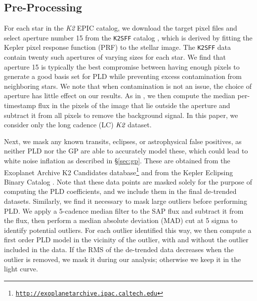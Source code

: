 \documentclass[]{emulateapj}
\begin{document}
\subsection{Pre-Processing}
\label{sec:pre}
For each star in the \emph{K2} EPIC catalog, we download the target pixel files and
select aperture number 15 from the \texttt{K2SFF} catalog \citep{VJ14, VAN14}, which is derived
by fitting the Kepler pixel response function (PRF) to the stellar image. The \texttt{K2SFF}
data contain twenty such apertures of varying sizes for each star. We find that aperture 15
is typically the best compromise between having enough pixels to generate a good basis
set for PLD while preventing excess contamination from neighboring stars. We note that
when contamination is not an issue, the choice of aperture has little effect on our results.
As in \cite{VJ14}, we then compute the median per-timestamp flux in the pixels of the image 
that lie outside the aperture and subtract it from all pixels
to remove the background signal. In this paper, we consider only the long cadence (LC)
$\emph{K2}$ dataset.

Next, we mask any known transits, eclipses, or astrophysical false positives, as neither
PLD nor the GP are able to accurately model these, which could lead to white noise
inflation as described in \S\ref{sec:gp}. These are obtained from the Exoplanet Archive
K2 Candidates database\footnote{\texttt{\url{http://exoplanetarchive.ipac.caltech.edu}}} and from
the Kepler Eclipsing Binary Catalog \citep{LAC15}. Note that these data points are masked solely for
the purpose of computing the PLD coefficients, and we include them in the final
de-trended datasets. Similarly, we find it necessary to mask large outliers before
performing PLD. We apply a 5-cadence median filter to the SAP flux and subtract it
from the flux, then perform a median absolute deviation (MAD) cut at 5 sigma to 
identify potential outliers. For each outlier identified this way, we then compute
a first order PLD model in the vicinity of the outlier, with and without the outlier
included in the data. If the RMS of the de-trended data decreases when the outlier
is removed, we mask it during our analysis; otherwise we keep it in the light curve.
\end{document}
